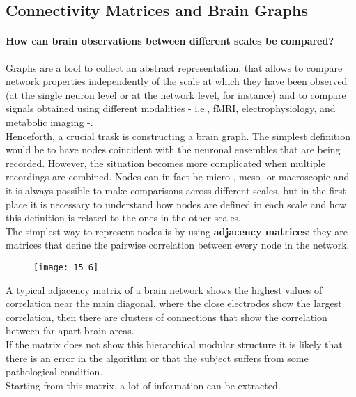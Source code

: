 \subsection{Connectivity Matrices and Brain Graphs}
\paragraph{How can brain observations between different scales be compared?} Graphs are a tool to collect an
abstract representation, that allows to compare network properties independently of the scale at which they
have been observed (at the single neuron level or at the network level, for instance) and to compare
signals obtained using different modalities - i.e., fMRI, electrophysiology, and metabolic imaging -.\\
Henceforth, a crucial trask is constructing a brain graph. The simplest definition would be to have nodes
coincident with the neuronal ensembles that are being recorded. However, the situation becomes more
complicated when multiple recordings are combined. Nodes can in fact be micro-, meso- or macroscopic and
it is always possible to make comparisons across different scales, but in the first place it is necessary
to understand how nodes are defined in each scale and how this definition is related to the ones in the other scales.\\
The simplest way to represent nodes is by using \textbf{adjacency matrices}: they are matrices that define the pairwise
correlation between every node in the network.
\begin{figure}[H]
    \centering
    \texttt{[image: 15\_6]}
\end{figure}
A typical adjacency matrix of a brain network shows the highest values of correlation near the main diagonal,
where the close electrodes show the largest correlation, then there are clusters of connections that show
the correlation between far apart brain areas.\\
If the matrix does not show this hierarchical modular structure it is likely that there is an error in the algorithm
or that the subject suffers from some pathological condition.\\
Starting from this matrix, a lot of information can be extracted.
